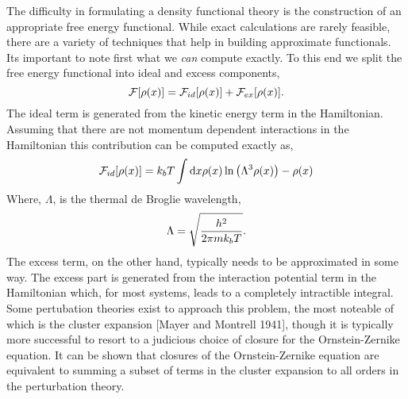 The difficulty in formulating a density functional theory is the construction of an appropriate free energy functional.
While exact calculations are rarely feasible, there are a variety of techniques that help in building approximate functionals.
Its important to note first what we \textit{can} compute exactly.
To this end we split the free energy functional into ideal and excess components,
\begin{equation}
    \mathcal{F}[\rho(x)] = \mathcal{F}_{id}[\rho(x)] + \mathcal{F}_{ex}[\rho(x)].
\end{equation}
The ideal term is generated from the kinetic energy term in the Hamiltonian.
Assuming that there are not momentum dependent interactions in the Hamiltonian this contribution can be computed exactly as,
\begin{equation}
    \mathcal{F}_{id}[\rho(x)] = k_bT\int \mathrm{d}x \rho(x) 
        \ln\left(\Lambda^3\rho(x)\right) - \rho(x)
\end{equation}
Where, $\Lambda$, is the thermal de Broglie wavelength,
\begin{equation}
    \Lambda = \sqrt{\frac{h^2}{2\pi mk_bT}}.
\end{equation}
The excess term, on the other hand, typically needs to be approximated in some way.
The excess part is generated from the interaction potential term in the Hamiltonian which, for most systems, leads to a completely intractible integral.
Some pertubation theories exist to approach this problem, the most noteable of which is the cluster expansion [Mayer and Montrell 1941], though it is typically more successful to resort to a judicious choice of closure for the Ornstein-Zernike equation.
It can be shown that closures of the Ornstein-Zernike equation are equivalent to summing a subset of terms in the cluster expansion to all orders in the perturbation theory.
